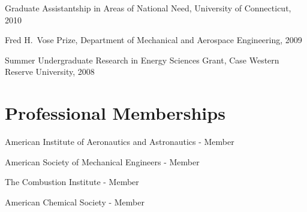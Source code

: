 Graduate Assistantship in Areas of National
Need, University of Connecticut, 2010

Fred H.\ Vose Prize, Department of Mechanical and
Aerospace Engineering, 2009

Summer Undergraduate Research in Energy Sciences
Grant, Case Western Reserve University, 2008

\section{{\sectionfont Professional Memberships}}
American Institute of Aeronautics and Astronautics - Member

American Society of Mechanical Engineers - Member

The Combustion Institute - Member

American Chemical Society - Member



